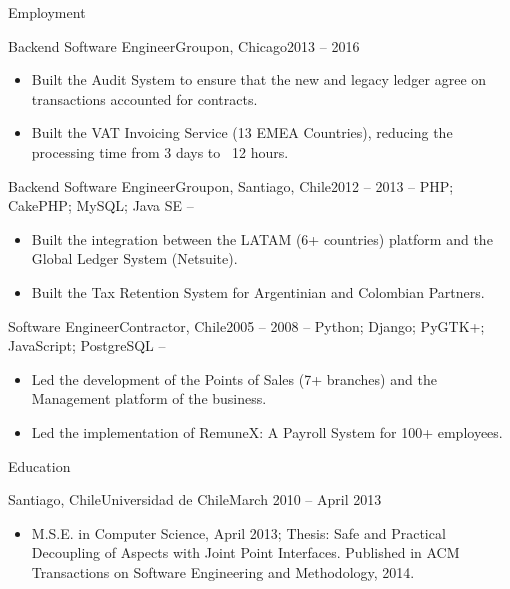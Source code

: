 \documentclass[]{mcdowellcv}
\begin{document}
\begin{cvsection}{Employment}
\begin{cvsubsection}{Backend Software Engineer}{Groupon, Chicago}{2013 -- 2016}
\begin{itemize}
				\item Built the Audit System to ensure that the new and legacy ledger agree on transactions accounted for contracts.
				\item Built the VAT Invoicing Service (13 EMEA Countries), reducing the processing time from 3 days to ~12 hours.
			\end{itemize}
		\end{cvsubsection}
		\begin{cvsubsection}{Backend Software Engineer}{Groupon, Santiago, Chile}{2012 -- 2013}
			 -- PHP; CakePHP; MySQL; Java SE --
			\begin{itemize}
				\item Built the integration between the LATAM (6+ countries) platform and the Global Ledger System (Netsuite).
				\item Built the Tax Retention System for Argentinian and Colombian Partners.
			\end{itemize}
		\end{cvsubsection}		
		\begin{cvsubsection}{Software Engineer}{Contractor, Chile}{2005 -- 2008}
		         -- Python; Django; PyGTK+; JavaScript; PostgreSQL --
			\begin{itemize}
				\item Led the development of the Points of Sales (7+ branches) and the Management platform of the business.
				\item Led the implementation of RemuneX: A Payroll System for 100+ employees.
			\end{itemize}
		\end{cvsubsection}
	\end{cvsection}
	
	\begin{cvsection}{Education}
		\begin{cvsubsection}{Santiago, Chile}{Universidad de Chile}{March 2010 --  April 2013}
			\begin{itemize}
				\item M.S.E. in Computer Science, April 2013; Thesis: Safe and Practical Decoupling of Aspects with Joint Point Interfaces. Published in ACM Transactions on Software Engineering and Methodology, 2014.
			\end{itemize}
		\end{cvsubsection}
	\end{cvsection}
	
\end{document}
